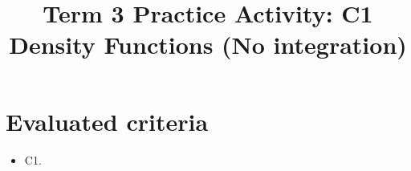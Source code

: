 \makeatletter
{}
\makeatother	


\usepackage{pgfplots}
\pgfplotsset{compat=1.18}

\title{Term 3 Practice Activity: C1 Density Functions (No integration)}
\author{}
\date{}


	\maketitle

	\setcounter{tocdepth}{1}
	\setcounter{secnumdepth}{2}
	\tableofcontents

	\section*{Evaluated criteria}
	\begin{itemize}
		\item C1.
	\end{itemize}

	
	
	
	

\newcommand{\COneGraph}[7]{
\begin{center}
\begin{tikzpicture}
\pgfmathsetmacro{\supportA}{#1}
\pgfmathsetmacro{\supportB}{#2}
\pgfmathsetmacro{\pad}{0.12*(\supportB-\supportA)}
\begin{axis}[
  width=9cm,
  height=5cm,
  axis lines=left,
  xlabel={$x$},
  ylabel={$f(x)$},
  xmin={\supportA-\pad},
  xmax={\supportB+\pad},
  ymin=0,
  ymax=#7,
  grid=both,
  xtick={#6}
]
\addplot[domain=#1:#2, samples=160, draw=none, fill=blue!20, fill opacity=0.35] {#3} \closedcycle;
\addplot[domain=#4:#5, samples=160, draw=none, fill=blue!60, fill opacity=0.55] {#3} \closedcycle;
\addplot[smooth, domain=#1:#2, samples=160, thick] {#3};
\end{axis}
\end{tikzpicture}
\end{center}
}

\newcommand{\COneCompareGraph}[6]{
\begin{center}
\begin{tikzpicture}
\begin{axis}[
  width=9cm,
  height=5cm,
  axis lines=left,
  xlabel={$x$},
  ylabel={$f(x)$},
  xmin=#1,
  xmax=#2,
  ymin=0,
  ymax=#6,
  grid=both,
  xtick={0,1,2,3,4,5}
]
\addplot[smooth, domain=#3:#4, samples=150, thick, blue] {#5};
\addplot[smooth, domain=#3:#4, samples=150, thick, red, dashed] {#5*1.6};
\end{axis}
\end{tikzpicture}
\end{center}
}

